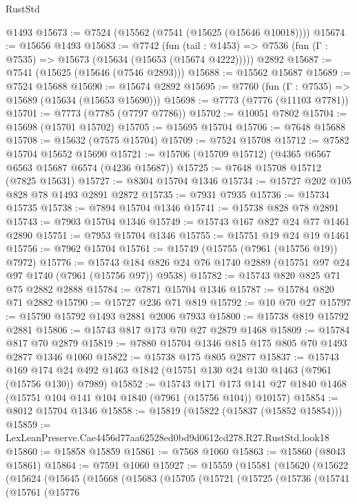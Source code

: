 \begin{lexlean}{RustStd}
\begin{coremodule}
    @1493
@15673 := @7524 (@15562 (@7541 (@15625 (@15646 @10018))))
@15674 := @15656 @1493
@15683 := @7742
    (fun (tail : @1453) => @7536 (fun (Γ : @7535) => @15673 (@15634 (@15653 (@15674 @4222)))))
    @2892
@15687 := @7541 (@15625 (@15646 (@7546 @2893)))
@15688 := @15562 @15687
@15689 := @7524 @15688
@15690 := @15674 @2892
@15695 := @7760 (fun (Γ : @7535) => @15689 (@15634 (@15653 @15690)))
@15698 := @7773 (@7776 (@11103 @7781))
@15701 := @7773 (@7785 (@7797 @7786))
@15702 := @10051 @7802
@15704 := @15698 (@15701 @15702)
@15705 := @15695 @15704
@15706 := @7648 @15688
@15708 := @15632 (@7575 @15704)
@15709 := @7524 @15708
@15712 := @7582 @15704 @15652 @15690
@15721 := @15706 (@15709 @15712) (@4365 @6567 @6563 @15687 @6574 (@4236 @15687))
@15725 := @7648 @15708 @15712 (@7825 @15631)
@15727 := @8304 @15704 @1346
@15734 := @15727 @202 @105 @828 @78 @1493 @2891 @2872
@15735 := @7931 @7935
@15736 := @15734 @15735
@15738 := @7894 @15704 @1346
@15741 := @15738 @828 @78 @2891
@15743 := @7903 @15704 @1346
@15749 := @15743 @167 @827 @24 @77 @1461 @2890
@15751 := @7953 @15704 @1346
@15755 := @15751 @19 @24 @19 @1461
@15756 := @7962 @15704
@15761 := @15749 (@15755 (@7961 (@15756 @19)) @7972)
@15776 := @15743 @184 @826 @24 @76 @1740 @2889 (@15751 @97 @24 @97 @1740 (@7961 (@15756 @97)) @9538)
@15782 := @15743 @820 @825 @71 @75 @2882 @2888
@15784 := @7871 @15704 @1346
@15787 := @15784 @820 @71 @2882
@15790 := @15727 @236 @71 @819
@15792 := @10 @70 @27
@15797 := @15790 @15792 @1493 @2881 @2006 @7933
@15800 := @15738 @819 @15792 @2881
@15806 := @15743 @817 @173 @70 @27 @2879 @1468
@15809 := @15784 @817 @70 @2879
@15819 := @7880 @15704 @1346 @815 @175 @805 @70 @1493 @2877 @1346 @1060
@15822 := @15738 @175 @805 @2877
@15837 := @15743
    @169
    @174
    @24
    @492
    @1463
    @1842
    (@15751 @130 @24 @130 @1463 (@7961 (@15756 @130)) @7989)
@15852 := @15743
    @171
    @173
    @141
    @27
    @1840
    @1468
    (@15751 @104 @141 @104 @1840 (@7961 (@15756 @104)) @10157)
@15854 := @8012 @15704 @1346
@15858 := @15819 (@15822 (@15837 (@15852 @15854)))
@15859 := LexLeanPreserve.Cae4456d77aa62528ed0bd9d0612cd278.R27.RustStd.look18
@15860 := @15858 @15859
@15861 := @7568 @1060
@15863 := @15860 (@8043 @15861)
@15864 := @7591 @1060
@15927 := @15559
    (@15581
      (@15620
        (@15622
          (@15624
            (@15645
              (@15668
                (@15683
                  (@15705
                    (@15721
                      (@15725
                        (@15736
                          (@15741
                            (@15761
                              (@15776

\end{coremodule}
\end{lexlean}
